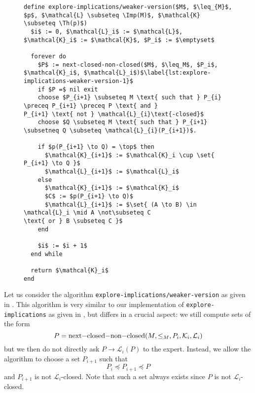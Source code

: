 \begin{figure}[tp]
  \begin{Algorithm}
    \label{alg:explore-implications-weaker-version}
    \hspace*{0cm}
\begin{lstlisting}
define explore-implications/weaker-version($M$, $\leq_{M}$, $p$, $\mathcal{L} \subseteq \Imp(M)$, $\mathcal{K} \subseteq \Th(p)$)
  $i$ := 0, $\mathcal{L}_i$ := $\mathcal{L}$, $\mathcal{K}_i$ := $\mathcal{K}$, $P_i$ := $\emptyset$

  forever do
    $P$ := next-closed-non-closed($M$, $\leq_M$, $P_i$, $\mathcal{K}_i$, $\mathcal{L}_i$)$\label{lst:explore-implications-weaker-version-1}$
    if $P =$ nil exit
    choose $P_{i+1} \subseteq M \text{ such that } P_{i} \preceq P_{i+1} \preceq P \text{ and }
P_{i+1} \text{ not } \mathcal{L}_{i}\text{-closed}$
    choose $Q \subseteq M \text{ such that } P_{i+1} \subsetneq Q \subseteq \mathcal{L}_{i}(P_{i+1})$.

    if $p(P_{i+1} \to Q) = \top$ then
      $\mathcal{K}_{i+1}$ := $\mathcal{K}_i \cup \set{ P_{i+1} \to Q }$
      $\mathcal{L}_{i+1}$ := $\mathcal{L}_i$
    else
      $\mathcal{K}_{i+1}$ := $\mathcal{K}_i$
      $C$ := $p(P_{i+1} \to Q)$
      $\mathcal{L}_{i+1}$ := $\set{ (A \to B) \in \mathcal{L}_i \mid A \not\subseteq C
\text{ or } B \subseteq C }$
    end

    $i$ := $i + 1$
  end while

  return $\mathcal{K}_i$  
end
\end{lstlisting}
  \end{Algorithm}
\end{figure}

Let us consider the algorithm \lstinline{explore-implications/weaker-version} as given in
.  This algorithm is very similar to our
implementation of \lstinline{explore-implications} as given in
, but differs in a crucial aspect:  we still compute sets
of the form
\begin{equation*}
  P = \text{\lstinline{next-closed-non-closed}}(M, \leq_{M}, P_{i}, \mathcal{K}_{i}, \mathcal{L}_{i})
\end{equation*}
but we then do not directly ask $P \to \mathcal{L}_{i}(P)$ to the expert.  Instead, we
allow the algorithm to choose a set $P_{i+1}$ such that
\begin{equation*}
  P_{i} \preceq P_{i+1} \preceq P
\end{equation*}
and $P_{i+1}$ is not $\mathcal{L}_{i}$-closed.  Note that such a set always exists since
$P$ is not $\mathcal{L}_{i}$-closed.

